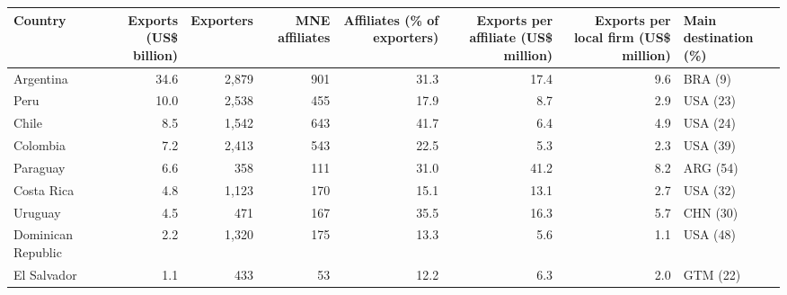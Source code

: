 \begin{tabular}{lrrrrrrl}
\toprule
Country & Exports (US\$ billion) & Exporters & MNE affiliates & Affiliates (\% of exporters) & Exports per affiliate (US\$ million) & Exports per local firm (US\$ million) & Main destination (\%) \\
\midrule
Argentina & 34.6 & 2,879 & 901 & 31.3 & 17.4 & 9.6 & BRA (9) \\
Peru & 10.0 & 2,538 & 455 & 17.9 & 8.7 & 2.9 & USA (23) \\
Chile & 8.5 & 1,542 & 643 & 41.7 & 6.4 & 4.9 & USA (24) \\
Colombia & 7.2 & 2,413 & 543 & 22.5 & 5.3 & 2.3 & USA (39) \\
Paraguay & 6.6 & 358 & 111 & 31.0 & 41.2 & 8.2 & ARG (54) \\
Costa Rica & 4.8 & 1,123 & 170 & 15.1 & 13.1 & 2.7 & USA (32) \\
Uruguay & 4.5 & 471 & 167 & 35.5 & 16.3 & 5.7 & CHN (30) \\
Dominican Republic & 2.2 & 1,320 & 175 & 13.3 & 5.6 & 1.1 & USA (48) \\
El Salvador & 1.1 & 433 & 53 & 12.2 & 6.3 & 2.0 & GTM (22) \\
\bottomrule
\end{tabular}

